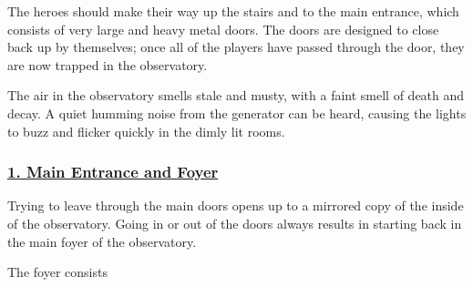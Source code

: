 \documentclass{article}
\begin{document}
\begin{multicols*}{2}
		The heroes should make their way up the stairs and to the main entrance, which consists of very large and heavy metal doors. The doors are designed to close back up by themselves; once all of the players have passed through the door, they are now trapped in the observatory. 
		
		The air in the observatory smells stale and musty, with a faint smell of death and decay. A quiet humming noise from the generator can be heard, causing the lights to buzz and flicker quickly in the dimly lit rooms.
		
		\subsubsection*{\underline{1. Main Entrance and Foyer}}
	
		
		Trying to leave through the main doors opens up to a mirrored copy of the inside of the observatory. Going in or out of the doors always results in starting back in the main foyer of the observatory.
		
		The foyer consists
		
		
		
	
	
\end{multicols*}
	
\end{document}
